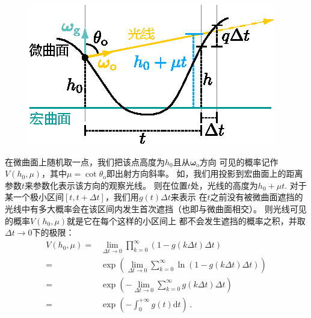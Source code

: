 \begin{figure}[htbp]
    \centering
    \includegraphics[width=0.85\linewidth]{Pictures/chap08/GeometryForSmithShadowingMasking.eps}
    \caption{}
    \label{fig:08ex01-G1Geometry}
\end{figure}

在微曲面上随机取一点，我们把该点高度为$h_0$且从${\bm\omega}_{\mathrm{o}}$方向
可见的概率记作$V(h_0,\mu)$，其中$\mu=\cot\theta_{\mathrm{o}}$即出射方向斜率。
如，我们用投影到宏曲面上的距离参数$t$来参数化表示该方向的观察光线。
则在位置$t$处，光线的高度为$h_0+\mu t$.
对于某一个极小区间$[t,t+\Delta t]$，我们用$g(t)\Delta t$来表示
在$t$之前没有被微曲面遮挡的光线中有多大概率会在该区间内发生首次遮挡（也即与微曲面相交）。
则光线可见的概率$V(h_0,\mu)$就是它在每个这样的小区间上
都不会发生遮挡的概率之积，并取$\Delta t\to 0$下的极限：
\begin{align}
    V(h_0,\mu)=&\lim\limits_{\Delta t\to 0}\prod\limits_{k=0}^{\infty}(1-g(k\Delta t)\Delta t)\nonumber\\
    =&\exp\left(\lim\limits_{\Delta t\to 0}\sum\limits_{k=0}^{\infty}\ln(1-g(k\Delta t)\Delta t)\right)\nonumber\\
    =&\exp\left(-\lim\limits_{\Delta t\to 0}\sum\limits_{k=0}^{\infty}g(k\Delta t)\Delta t\right)\nonumber\\
    =&\exp\left(-\int_{0}^{+\infty}g(t)\mathrm{d}t\right)\, .
\end{align}

